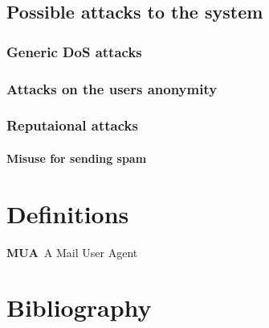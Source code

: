 \documentclass[11pt,a4paper]{book}
\newenvironment{entry}{\par\leavevmode\hangpara{1.5mm}{1}\ignorespaces}{\RaggedRight\par}
\newcommand*{\mainentry}[1]{{\bfseries{#1}}~}
\begin{document}
\section{Possible attacks to the system}
\subsection{Generic DoS attacks}
\subsection{Attacks on the users anonymity}
\subsection{Reputaional attacks}
\subsubsection{Misuse for sending spam}
\begin{appendices}
\chapter{Definitions}
\begin{entry}
\mainentry{MUA}{A Mail User Agent}
\end{entry}

\chapter{Bibliography}
\printbibliography[title={},heading=none]
\end{appendices}
\end{document}
